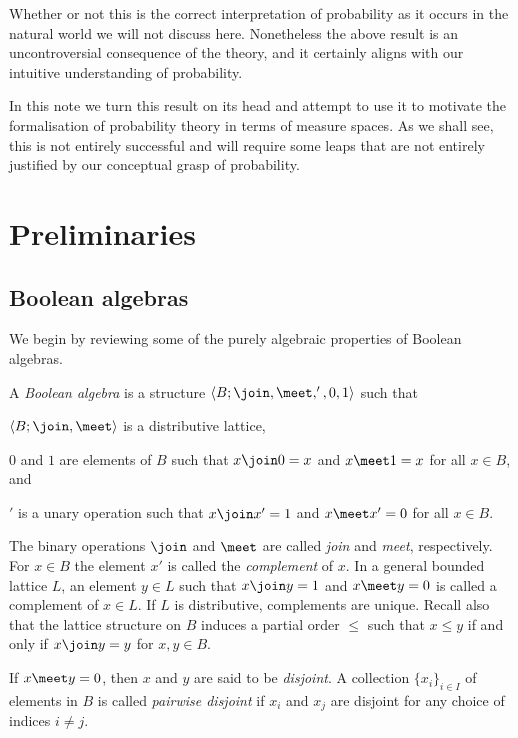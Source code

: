\documentclass[article, a4paper, 11pt, oneside]{memoir}
\numberwithin{equation}{chapter}
\begin{document}
Whether or not this is the correct interpretation of probability as it occurs in the natural world we will not discuss here. Nonetheless the above result is an uncontroversial consequence of the theory, and it certainly aligns with our intuitive understanding of probability.

In this note we turn this result on its head and attempt to use it to motivate the formalisation of probability theory in terms of measure spaces. As we shall see, this is not entirely successful and will require some leaps that are not entirely justified by our conceptual grasp of probability.


\chapter{Preliminaries}


\section{Boolean algebras}

We begin by reviewing some of the purely algebraic properties of Boolean algebras.

\begin{definition}
    \label{def:Boolean-algebra}
    A \emph{Boolean algebra} is a structure $\langle B; \join, \meet, ', 0, 1 \rangle$ such that
    \begin{enumdef}
        \item $\langle B; \join, \meet \rangle$ is a distributive lattice,
        \item $0$ and $1$ are elements of $B$ such that $x \join 0 = x$ and $x \meet 1 = x$ for all $x \in B$, and
        \item $'$ is a unary operation such that $x \join x' = 1$ and $x \meet x' = 0$ for all $x \in B$.
    \end{enumdef}
\end{definition}
%
The binary operations $\join$ and $\meet$ are called \emph{join} and \emph{meet}, respectively. For $x \in B$ the element $x'$ is called the \emph{complement} of $x$. In a general bounded lattice $L$, an element $y \in L$ such that $x \join y = 1$ and $x \meet y = 0$ is called a complement of $x \in L$. If $L$ is distributive, complements are unique. Recall also that the lattice structure on $B$ induces a partial order $\leq$ such that $x \leq y$ if and only if $x \join y = y$ for $x,y \in B$.

If $x \meet y = 0$, then $x$ and $y$ are said to be \emph{disjoint}. A collection $\{x_i\}_{i \in I}$ of elements in $B$ is called \emph{pairwise disjoint} if $x_i$ and $x_j$ are disjoint for any choice of indices $i \neq j$.
\end{document}
